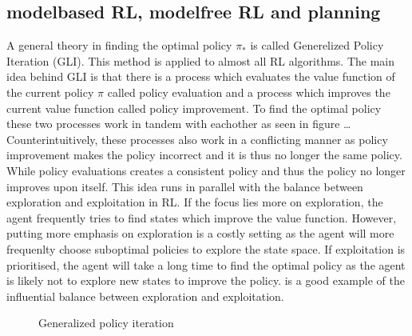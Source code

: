 \documentclass[letterpaper,10pt,english]{jupyterBook}
\let\sphinxpxdimen\pdfpxdimen\else\newdimen\sphinxpxdimen
\begin{document}
\subsection{model\sphinxhyphen{}based RL, model\sphinxhyphen{}free RL and planning}
\label{\detokenize{Reinforcement_learning:model-based-rl-model-free-rl-and-planning}}
\sphinxAtStartPar
A general theory in finding the optimal policy \(\pi_*\) is called Generelized Policy Iteration (GLI). This method is applied to almost all RL algorithms. The main idea behind GLI is that there is a process which evaluates the value function of the current policy \(\pi\) called policy evaluation and a process which improves the current value function called policy improvement. To find the optimal policy these two processes work in tandem with eachother as seen in figure … Counterintuitively, these processes also work in a conflicting manner as policy improvement makes the policy incorrect and it is thus no longer the same policy. While policy evaluations creates a consistent policy and thus the policy no longer improves upon itself. This idea runs in parallel with the balance between exploration and exploitation in RL.  If the focus lies more on exploration, the agent frequently tries to find states which improve the value function. However, putting more emphasis on exploration is a costly setting as the agent will more frequenlty choose suboptimal policies to explore the state space. If exploitation is prioritised, the agent will take a long time to find the optimal policy as the agent is likely not to explore new states to improve the policy.  is a good example of the influential balance between exploration and exploitation.

\begin{figure}[htbp]
\centering
\capstart

\noindent\sphinxincludegraphics[width=500\sphinxpxdimen,height=300\sphinxpxdimen]{{GPI}.png}
\caption{Generalized policy iteration}\label{\detokenize{Reinforcement_learning:gpi-fig}}\end{figure}
\end{document}
